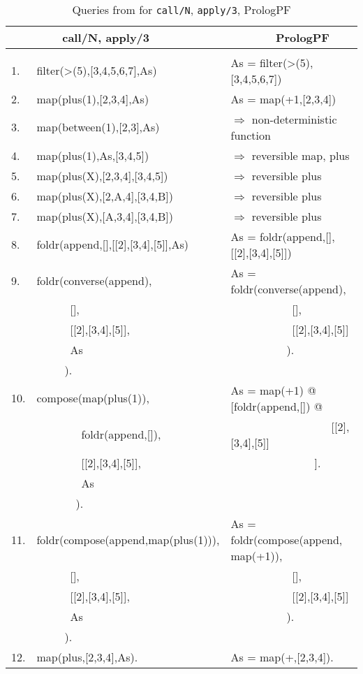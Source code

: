 \begin{table}[htbp]
{\footnotesize
\tt
\begin{tabular}{| l | l | l |}
\hline
   &~~~~call/N, apply/3          &~~~~~~~PrologPF \\
\hline
& & \\
1. &filter(>(5),[3,4,5,6,7],As)  &As = filter(>(5),[3,4,5,6,7])\\
2. &map(plus(1),[2,3,4],As)      &As = map(+1,[2,3,4])\\
3. &map(between(1),[2,3],As)     &$\Rightarrow$ non-deterministic function\\
4. &map(plus(1),As,[3,4,5])      &$\Rightarrow$ reversible map, plus\\
5. &map(plus(X),[2,3,4],[3,4,5]) &$\Rightarrow$ reversible plus\\
6. &map(plus(X),[2,A,4],[3,4,B]) &$\Rightarrow$ reversible plus\\
7. &map(plus(X),[A,3,4],[3,4,B]) &$\Rightarrow$ reversible plus\\
8. &foldr(append,[],[[2],[3,4],[5]],As) &As = foldr(append,[],[[2],[3,4],[5]]) \\
9. &foldr(converse(append),      &As = foldr(converse(append),\\
   &~~~~~~[],                    &~~~~~~~~~~~[],\\
   &~~~~~~[[2],[3,4],[5]],       &~~~~~~~~~~~[[2],[3,4],[5]]\\
   &~~~~~~As                     &~~~~~~~~~~).\\
   &~~~~~).                      & \\
10. &compose(map(plus(1)),       &As = map(+1) @ [foldr(append,[]) @\\
    &~~~~~~~~foldr(append,[]),   &~~~~~~~~~~~~~~~~~~[[2],[3,4],[5]]\\
    &~~~~~~~~[[2],[3,4],[5]],    &~~~~~~~~~~~~~~~].\\
    &~~~~~~~~As                  & \\
    &~~~~~~~).                   & \\
11. &foldr(compose(append,map(plus(1))), &As = foldr(compose(append, map(+1)),\\
    &~~~~~~[],                           &~~~~~~~~~~~[],\\
    &~~~~~~[[2],[3,4],[5]],              &~~~~~~~~~~~[[2],[3,4],[5]]\\
    &~~~~~~As                            &~~~~~~~~~~). \\
    &~~~~~).                             & \\
12. &map(plus,[2,3,4],As).       & As = map(+,[2,3,4]).\\
\hline
\end{tabular}
}
\label{call_apply_queries}
\caption{Queries from \cite{Nai96} for \texttt{call/N}, \texttt{apply/3}, PrologPF}
\end{table}

